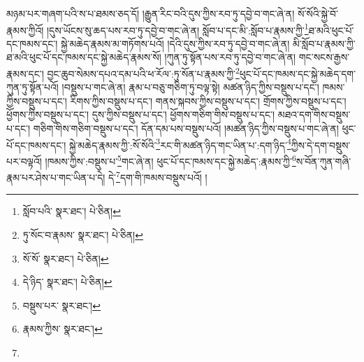 མཉམ་པར་གཞག་པའི་ས་པ་ཐམས་ཅད་དོ། །རྒྱུན་རིང་བའི་དུས་ཀྱིས་རབ་ཏུ་དབྱེ་བ་གང་ཞེ་ན། སོ་སོའི་སྐྱེ་བོ་རྣམས་ཀྱིའོ། །དུས་ཡོངས་སུ་ཆད་པས་རབ་ཏུ་དབྱེ་བ་གང་ཞེ་ན། སློབ་པ་དང་མི་:སློབ་པ་རྣམས་ཀྱི་\footnote{སློབ་པའི་  སྣར་ཐང་།  པེ་ཅིན། }ཐ་མའི་ཕུང་པོ་དང་ཁམས་དང་། སྐྱེ་མཆེད་རྣམས་མ་གཏོགས་པའོ། །དེའི་དུས་ཀྱིས་རབ་ཏུ་དབྱེ་བ་གང་ཞེ་ན། མི་སློབ་པ་རྣམས་ཀྱི་ཐ་མའི་ཕུང་པོ་དང་ཁམས་དང་སྐྱེ་མཆེད་རྣམས་སོ། །ཀུན་ཏུ་སྟོན་པས་རབ་ཏུ་དབྱེ་བ་གང་ཞེ་ན། གང་སངས་རྒྱས་རྣམས་དང་། བྱང་ཆུབ་སེམས་དཔའ་དམ་པའི་ཕ་རོལ་:ཏུ་སོན་པ་རྣམས་ཀྱི་\footnote{ཏུ་སོང་བ་རྣམས་  སྣར་ཐང་།  པེ་ཅིན། }ཕུང་པོ་དང་ཁམས་དང་སྐྱེ་མཆེད་དག་ཀུན་ཏུ་སྟོན་པའོ། །བསྡུས་པ་གང་ཞེ་ན། རྣམ་པ་བཅུ་གཅིག་ཏུ་བལྟ་སྟེ། མཚན་ཉིད་ཀྱིས་བསྡུས་པ་དང་། ཁམས་ཀྱིས་བསྡུས་པ་དང་། རིགས་ཀྱིས་བསྡུས་པ་དང་། གནས་སྐབས་ཀྱིས་བསྡུས་པ་དང་། གྲོགས་ཀྱིས་བསྡུས་པ་དང་། ཕྱོགས་ཀྱིས་བསྡུས་པ་དང་། དུས་ཀྱིས་བསྡུས་པ་དང་། ཕྱོགས་གཅིག་གིས་བསྡུས་པ་དང་། མཐའ་དག་གིས་བསྡུས་པ་དང་། གཅིག་གིས་གཅིག་བསྡུས་པ་དང་། དོན་དམ་པས་བསྡུས་པའོ། །མཚན་ཉིད་ཀྱིས་བསྡུས་པ་གང་ཞེ་ན། ཕུང་པོ་དང་ཁམས་དང་། སྐྱེ་མཆེད་རྣམས་ཀྱི་:སོ་སོའི་\footnote{སོ་སོ་  སྣར་ཐང་།  པེ་ཅིན། }རང་གི་མཚན་ཉིད་གང་ཡིན་པ་:དག་ཉིད་\footnote{དེ་ཉིད་  སྣར་ཐང་།  པེ་ཅིན། }ཀྱིས་དེ་དག་བསྡུས་པར་བལྟའོ། །ཁམས་ཀྱིས་:བསྡུས་པ་\footnote{བསྡུས་པར་  སྣར་ཐང་། }གང་ཞེ་ན། ཕུང་པོ་དང་ཁམས་དང་སྐྱེ་མཆེད་:རྣམས་ཀྱི་\footnote{རྣམས་ཀྱིས་  སྣར་ཐང་། }ས་བོན་ཀུན་གཞི་རྣམ་པར་ཤེས་པ་གང་ཡིན་པ་དེ། དེ་\footnote{}དག་གི་ཁམས་བསྡུས་པའོ། །
